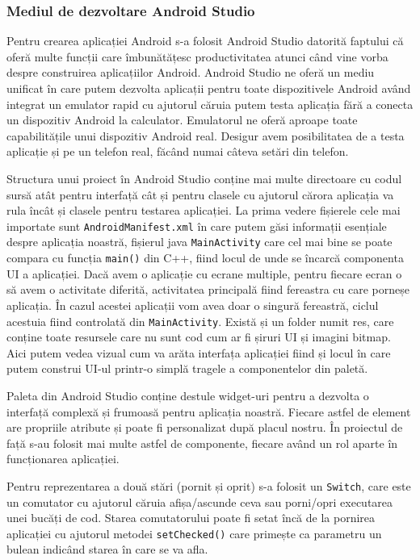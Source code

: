 \documentclass[../IoMusT.tex]{subfiles}
\begin{document}
\subsubsection{Mediul de dezvoltare Android Studio}
Pentru crearea aplicației Android s-a folosit Android Studio datorită faptului că oferă multe funcții care îmbunătățesc productivitatea atunci când vine vorba despre construirea  aplicațiilor Android. Android Studio ne oferă un mediu unificat în care putem dezvolta aplicații pentru toate dispozitivele Android având integrat un emulator rapid cu ajutorul căruia putem testa aplicația fără a conecta un dispozitiv Android la calculator. Emulatorul ne oferă aproape toate capabilitățile unui dispozitiv Android real. Desigur avem posibilitatea de a testa aplicație și pe un telefon real, făcând numai câteva setări din telefon.
\\
\par Structura unui proiect în Android Studio conține mai multe directoare cu codul sursă atât pentru interfață cât și pentru clasele cu ajutorul cărora aplicația va rula încât și clasele pentru testarea aplicației. La prima vedere fișierele cele mai importate sunt \verb|AndroidManifest.xml| în care putem găsi informații esențiale despre aplicația noastră, fișierul java \verb|MainActivity| care cel mai bine se poate compara cu funcția \verb|main()| din C++, fiind locul de unde se încarcă componenta UI a aplicației. Dacă avem o aplicație cu ecrane multiple, pentru fiecare ecran o să avem o activitate diferită, activitatea principală fiind fereastra cu care porneșe aplicația. În cazul acestei aplicații vom avea doar o singură fereastră, ciclul acestuia fiind controlată din \verb|MainActivity|. Există și un folder numit res, care conține toate resursele care nu sunt cod cum ar fi șiruri UI și imagini bitmap. Aici putem vedea vizual cum va arăta interfața aplicației fiind și locul în care putem construi UI-ul printr-o simplă tragele a componentelor din paletă.
\\
\par Paleta din Android Studio conține destule widget-uri pentru a dezvolta o interfață complexă și frumoasă pentru aplicația noastră. Fiecare astfel de element are propriile atribute și poate fi personalizat după placul nostru. În proiectul de față s-au folosit mai multe astfel de componente, fiecare având un rol aparte în funcționarea aplicației.
\\
\par
 Pentru reprezentarea a două stări (pornit și oprit) s-a folosit un \verb|Switch|, care este un comutator cu ajutorul căruia afișa/ascunde ceva sau porni/opri executarea unei bucăți de cod. Starea comutatorului poate fi setat încă de la pornirea aplicației cu ajutorul metodei \verb|setChecked()| care primește ca parametru un bulean indicând starea în care se va afla.
\end{document}
